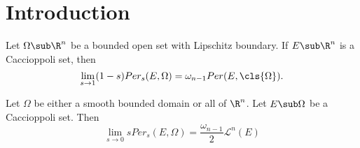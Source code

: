 \documentclass[../main.tex]{subfiles}
\begin{document}
\section{Introduction}

\begin{maintheorem}\label{sto1}
    Let $ \Omega\sub \R^{n} $ be a bounded open set with Lipschitz boundary. If $ E\sub \R^{n} $ is a Caccioppoli set, then
    \begin{equation}
        \lim_{s\to1}(1-s) Per_{s}(E, \Omega) = \omega_{n-1} Per(E,\cls{\Omega}).
    \end{equation}
\end{maintheorem}


\begin{maintheorem}\label{sto0}
    Let $ \Omega $ be either a smooth bounded domain or all of $ \R^{n} $. Let $ E\sub \Omega $ be a Caccioppoli set. Then 
    \begin{equation}
        \lim_{s\to0} sPer_{s}(E,\Omega) = \frac{\omega_{n-1}}{2} \mathcal{L}^{n}(E)
    \end{equation}
\end{maintheorem}
\end{document}
